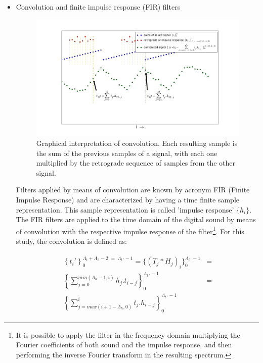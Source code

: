 \documentclass[
 aip,
 jmp,
 amsmath,amssymb,
 reprint,
]{revtex4-1}
\begin{document}
\begin{itemize}
  \item  Convolution and finite impulse response (FIR) filters

\begin{figure}[h!]
     \centering
         \includegraphics[width=\columnwidth]{figures/convolucao}
     \caption{Graphical interpretation of convolution. Each resulting sample is the sum of the previous samples of a signal, with each one multiplied by the retrograde sequence of samples from the other signal.}
         \label{fig:conv}
\end{figure}

Filters applied by means of convolution are known by acronym FIR (Finite Impulse Response) and are characterized by having a time finite sample representation. This sample representation is called 'impulse response' $\{h_i\}$. The FIR filters are applied to the time domain of the digital sound by means of convolution with the respective impulse response of the filter\footnote{It is possible to apply the filter in the frequency domain multiplying the Fourier coefficients of both sound and the impulse response, and then performing the inverse Fourier transform in the resulting spectrum.\cite{Openheim}}. For this study, the convolution is defined as:

\begin{multline}\label{eq:conv}
 \begin{split}
 \left\{t_i'\right\}_0^{\Lambda_t+\Lambda_h-2\; = \;\Lambda_{t\, '}-1} =\{(T_j*H_j)_i\}_0^{\Lambda_{t \, '}-1} & = \\ \left \{ \sum_{j=0}^{min(\Lambda_h-1,i)}h_{j} . t_{i-j} \right \}_0^{\Lambda_{t\, '}-1} 
     & = \\ \left \{ \sum_{j=max(i+1-\Lambda_h,0)}^{i}t_j . h_{i-j} \right \}_0^{\Lambda_{t\, '}-1}
 \end{split}
\end{multline}


\end{itemize}
\end{document}
